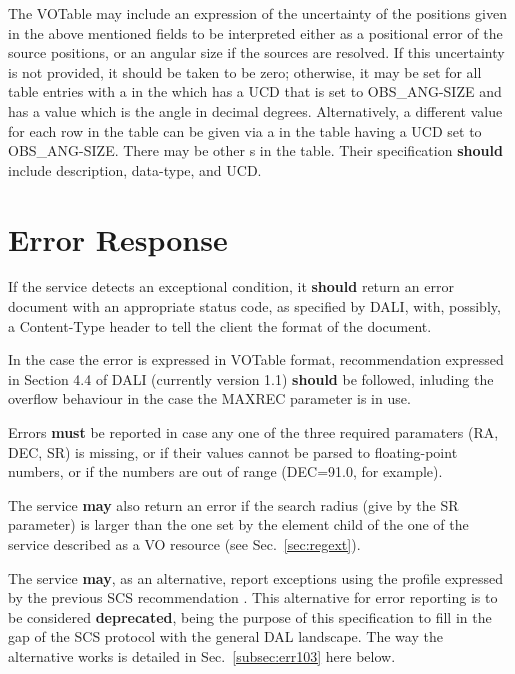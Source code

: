 \documentclass[11pt,a4paper]{ivoa}
\begin{document}
The VOTable may include an expression of the uncertainty of the positions given in the above mentioned fields to be interpreted either as a positional error of the source positions, or an angular size if the sources are resolved. If this uncertainty is not provided, it should be taken to be zero; otherwise, it may be set for all table entries with a  in the  which has a UCD that is set to OBS\_ANG-SIZE and has a value which is the angle in decimal degrees. Alternatively, a different value for each row in the table can be given via a  in the table having a UCD set to OBS\_ANG-SIZE.
There may be other s in the table. Their specification \textbf{should} include description, data-type, and UCD.

\section{Error Response}
\label{sec:error}

If the service detects an exceptional condition, it \textbf{should} return an error document with an appropriate status code, as specified by DALI, with, possibly, a Content-Type header to tell the client the format of the document.

In the case the error is expressed in VOTable format, recommendation expressed in Section 4.4 of DALI (currently version 1.1) \textbf{should} be followed, inluding the overflow behaviour in the case the MAXREC parameter is in use.

Errors \textbf{must} be reported in case any one of the three required paramaters (RA, DEC, SR) is missing, 
or if their values cannot be parsed to floating-point numbers, or if the numbers are out of range (DEC=91.0, for example). 

The service \textbf{may} also return an error if the search radius (give by the SR parameter) is larger than the one set by the  element child of the  one of the service described as a VO resource (see Sec.~\ref{sec:regext}).

The service \textbf{may}, as an alternative, report exceptions using the profile expressed by the previous SCS recommendation \citep[v1.03]{std:SCS}. This alternative for error reporting is to be considered \textbf{deprecated}, being the purpose of this specification to fill in the gap of the SCS protocol with the general DAL landscape. The way the alternative works is detailed in Sec.~\ref{subsec:err103} here below.
\end{document}
